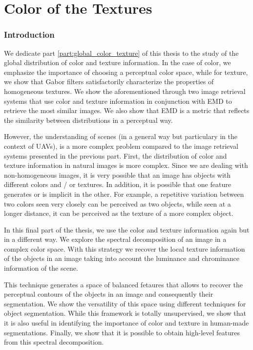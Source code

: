 \part{Color of the Textures}\label{part:local_color_of_texture}

\section*{Introduction}
We dedicate part \ref{part:global_color_texture} of this thesis to the study of the global distribution of color and texture information. In the case of color, we emphasize the importance of choosing a perceptual color space, while for texture, we show that Gabor filters satisfactorily characterize the properties of homogeneous textures. We show the aforementioned through two image retrieval systems that use color and texture information in conjunction with EMD to retrieve the most similar images. We also show that EMD is a metric that reflects the similarity between distributions in a perceptual way.

However, the understanding of scenes (in a general way but particulary in the context of UAVs), is a more complex problem compared to the image retrieval systems presented in the previous part.
First, the distribution of color and texture information in natural images is more complex. Since we are dealing with non-homogeneous images, it is very possible that an image has objects with different colors and / or textures. In addition, it is possible that one feature generates or is implicit in the other. For example, a repetitive variation between two colors seen very closely can be perceived as two objects, while seen at a longer distance, it can be perceived as the texture of a more complex object.

In this final part of the thesis, we use the color and texture information again but in a different way. We explore the spectral decomposition of an image in a complex color space. With this strategy we recover the local texture information of the objects in an image taking into account the luminance and chrominance information of the scene.

This technique generates a space of balanced fetaures that allows to recover the perceptual contours of the objects in an image and consequently their segmentation. We show the versatility of this space using different techniques for object segmentation. While this framework is totally unsupervised, we show that it is also useful in identifying the importance of color and texture in human-made segmentations. Finally, we show that it is possible to obtain high-level features from this spectral decomposition.

